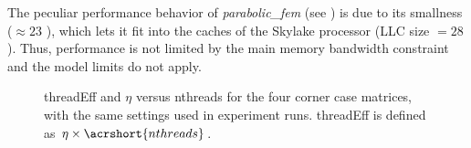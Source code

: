 The peculiar performance behavior of
\emph{parabolic\_fem}
(see ) is due to 
its smallness ($\approx 23$ \MB), which lets it fit into the caches of the
Skylake processor (\acrshort{LLC} size $= 28$ \MB). Thus, performance is not
limited by the main memory bandwidth constraint and the \roofline model limits do
not apply.
\begin{figure}[t]
	\centering
	\caption{\acrshort{threadEff} and $\eta$ versus \acrshort{nthreads} for
	the four corner case matrices, with the same settings used in experiment
	runs. \acrshort{threadEff} is defined as
	$\eta\times\acrshort{nthreads}$.}
	\label{fig:corner_cases_param}
\end{figure}
